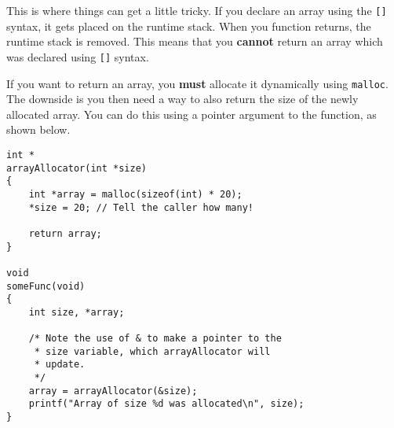 This is where things can get a little tricky.
If you declare an array using the \texttt{[]} syntax, it gets placed on the runtime stack.
When you function returns, the runtime stack is removed.
This means that you \textbf{cannot} return an array which was declared using \texttt{[]} syntax.

If you want to return an array, you \textbf{must} allocate it dynamically using \texttt{malloc}.
The downside is you then need a way to also return the size of the newly allocated array.
You can do this using a pointer argument to the function, as shown below.

\begin{lstlisting}
int *
arrayAllocator(int *size)
{
    int *array = malloc(sizeof(int) * 20);
    *size = 20; // Tell the caller how many!

    return array;
}

void
someFunc(void)
{
    int size, *array;

    /* Note the use of & to make a pointer to the
     * size variable, which arrayAllocator will
     * update.
     */
    array = arrayAllocator(&size);
    printf("Array of size %d was allocated\n", size);
}
\end{lstlisting}
